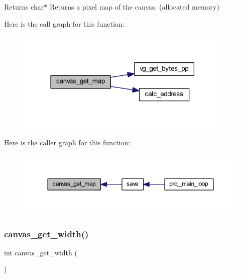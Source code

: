 \begin{DoxyReturn}{Returns}
char$\ast$ Returns a pixel map of the canvas. (allocated memory) 
\end{DoxyReturn}
Here is the call graph for this function\+:\nopagebreak
\begin{figure}[H]
\begin{center}
\leavevmode
\includegraphics[width=294pt]{group__canvas_gaa7891435582c7691d473ac6532e497a9_cgraph}
\end{center}
\end{figure}
Here is the caller graph for this function\+:\nopagebreak
\begin{figure}[H]
\begin{center}
\leavevmode
\includegraphics[width=350pt]{group__canvas_gaa7891435582c7691d473ac6532e497a9_icgraph}
\end{center}
\end{figure}
\mbox{\label{group__canvas_gaa5703f24ea2a8ec8bee2c73225c39553}} 
\subsubsection{\texorpdfstring{canvas\+\_\+get\+\_\+width()}{canvas\_get\_width()}}
{\footnotesize\ttfamily int canvas\+\_\+get\+\_\+width (\begin{DoxyParamCaption}{ }\end{DoxyParamCaption})}

